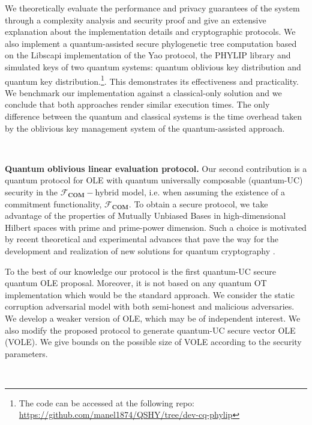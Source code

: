 We theoretically evaluate the performance and privacy guarantees of the system through a complexity analysis and security proof and give an extensive explanation about the implementation details and cryptographic protocols. We also implement a quantum-assisted secure phylogenetic tree computation based on the Libscapi implementation of the Yao protocol, the PHYLIP library and simulated keys of two quantum systems: quantum oblivious key distribution and quantum key distribution.\footnote{ The code can be accessed at the following repo: \href{https://github.com/manel1874/QSHY/tree/dev-cq-phylip}{https://github.com/manel1874/QSHY/tree/dev-cq-phylip}}. This demonstrates its effectiveness and practicality. We benchmark our implementation against a classical-only solution and we conclude that both approaches render similar execution times. The only difference between the quantum and classical systems is the time overhead taken by the oblivious key management system of the quantum-assisted approach.


\

\noindent\textbf{Quantum oblivious linear evaluation protocol.} Our second contribution is a quantum protocol for OLE with quantum universally composable (quantum-UC) security in the $\mathcal{F}_{\textbf{COM}}-$hybrid model, i.e. when assuming the existence of a commitment functionality, $\mathcal{F}_{\textbf{COM}}$. To obtain a secure protocol, we take advantage of the properties of Mutually Unbiased Bases in high-dimensional Hilbert spaces with prime and prime-power dimension. Such a choice is motivated by recent theoretical and experimental advances that pave the way for the development and realization of new solutions for quantum cryptography \cite{BPT00,DEBZ10,Zhongetal2015,BHVBFHM18,DHMPPV21}. 

To the best of our knowledge our protocol is the first quantum-UC secure quantum OLE proposal. Moreover, it is not based on any quantum OT implementation which would be the standard approach. %
We consider the static corruption adversarial model with both semi-honest and malicious adversaries. We develop a weaker version of OLE, which may be of independent interest. We also modify the proposed protocol to generate quantum-UC secure vector OLE (VOLE). We give bounds on the possible size of VOLE according to the security parameters.

\

